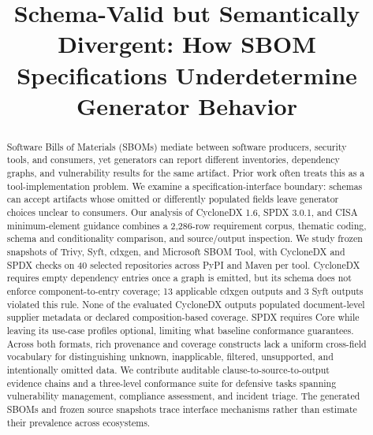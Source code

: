 \documentclass[sigconf, review, anonymous]{acmart}
\begin{document}
\title{Schema-Valid but Semantically Divergent: How SBOM Specifications Underdetermine Generator Behavior}

\begin{abstract}
Software Bills of Materials (SBOMs) mediate between software producers, security tools, and consumers, yet generators can report different inventories, dependency graphs, and vulnerability results for the same artifact. Prior work often treats this as a tool-implementation problem. We examine a specification-interface boundary: schemas can accept artifacts whose omitted or differently populated fields leave generator choices unclear to consumers. Our analysis of CycloneDX 1.6, SPDX 3.0.1, and CISA minimum-element guidance combines a 2,286-row requirement corpus, thematic coding, schema and conditionality comparison, and source/output inspection. We study frozen snapshots of Trivy, Syft, cdxgen, and Microsoft SBOM Tool, with CycloneDX and SPDX checks on 40 selected repositories across PyPI and Maven per tool. CycloneDX requires empty dependency entries once a graph is emitted, but its schema does not enforce component-to-entry coverage; 13 applicable cdxgen outputs and 3 Syft outputs violated this rule. None of the evaluated CycloneDX outputs populated document-level supplier metadata or declared composition-based coverage. SPDX requires Core while leaving its use-case profiles optional, limiting what baseline conformance guarantees. Across both formats, rich provenance and coverage constructs lack a uniform cross-field vocabulary for distinguishing unknown, inapplicable, filtered, unsupported, and intentionally omitted data. We contribute auditable clause-to-source-to-output evidence chains and a three-level conformance suite for defensive tasks spanning vulnerability management, compliance assessment, and incident triage. The generated SBOMs and frozen source snapshots trace interface mechanisms rather than estimate their prevalence across ecosystems.
\end{abstract}

\maketitle

\sloppy


\end{document}
